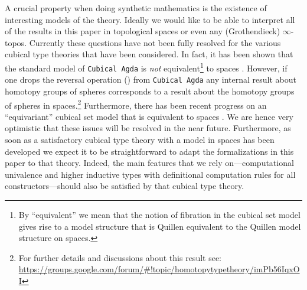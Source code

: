A crucial property when doing synthetic mathematics is the existence
of interesting models of the theory. Ideally we would like to be able
to interpret all of the results in this paper in topological spaces or
even any (Grothendieck) $\infty$-topos. Currently these questions have
not been fully resolved for the various cubical type theories that
have been considered. In fact, it has been shown that the standard
model of \texttt{Cubical Agda} is \emph{not} equivalent\footnote{By
  ``equivalent'' we mean that the notion of fibration in the cubical
  set model gives rise to a model structure that is Quillen equivalent
  to the Quillen model structure on spaces.} to spaces
. However, if one drops the reversal operation
() from \texttt{Cubical Agda} any internal result about homotopy
groups of spheres corresponds to a result about the homotopy groups of
spheres in spaces.\footnote{For further details and discussions about
  this result see:
  \url{https://groups.google.com/forum/\#!topic/homotopytypetheory/imPb56IqxOI}}
Furthermore, there has been recent progress on an ``equivariant''
cubical set model that is equivalent to spaces .  We
are hence very optimistic that these issues will be resolved in the
near future. Furthermore, as soon as a satisfactory cubical type
theory with a model in spaces has been developed we expect it to be
straightforward to adapt the formalizations in this paper to that
theory. Indeed, the main features that we rely on---computational
univalence and higher inductive types with definitional computation
rules for all constructors---should also be satisfied by that cubical
type theory.
